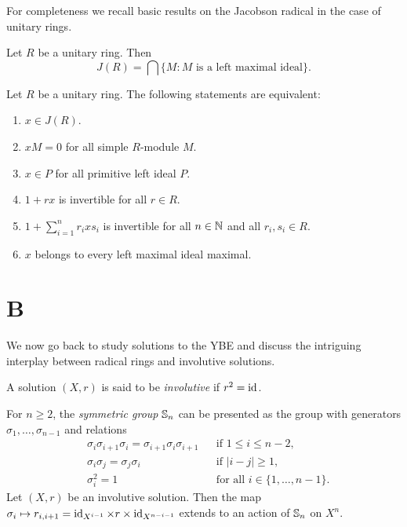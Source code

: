 For completeness we recall basic results on the Jacobson radical in the case
of unitary rings. 

\begin{exercise}
	Let $R$ be a unitary ring. Then  
	\[
	J(R)=\bigcap\{M:\text{$M$ is a left maximal ideal}\}.
	\]
\end{exercise}

\begin{exercise}
	Let $R$ be a unitary ring. The
	following statements are equivalent: 
	\begin{enumerate}
		\item $x\in J(R)$.
		\item $xM=0$ for all simple $R$-module $M$.
		\item $x\in P$ for all primitive left ideal $P$.
		\item $1+rx$ is invertible for all $r\in R$.
		\item $1+\sum_{i=1}^n r_ixs_i$ is invertible for all $n\in\mathbb{N}$ and all $r_i,s_i\in R$.
		\item $x$ belongs to every left maximal ideal maximal. 
	\end{enumerate}
\end{exercise}

\section*{{{\thesection}B}}

We now go back to study solutions to the YBE and discuss the intriguing interplay
between radical rings and involutive solutions. 

\begin{definition}
A solution $(X,r)$ is said to be \emph{involutive} if $r^2=\operatorname{id}$. 
\end{definition}

For $n\geq2$, the \emph{symmetric group} $\mathbb{S}_n$ can be presented 
as the group with generators $\sigma_1,\dots,\sigma_{n-1}$ and relations
\begin{align*}
    &\sigma_i\sigma_{i+1}\sigma_i=\sigma_{i+1}\sigma_i\sigma_{i+1} && \text{if }1\leq i\leq n-2,\\
    &\sigma_i\sigma_j=\sigma_j\sigma_i && \text{if }|i-j|\geq 1,\\
    &\sigma_i^2=1 && \text{for all $i\in\{1,\dots,n-1\}$}.
\end{align*}
Let $(X,r)$ be an involutive solution. 
Then the map $\sigma_i\mapsto r_{i,i+1}=\operatorname{id}_{X^{i-1}}\times r\times\operatorname{id}_{X^{n-i-1}}$ extends 
to an action of $\mathbb{S}_n$ on $X^n$.

